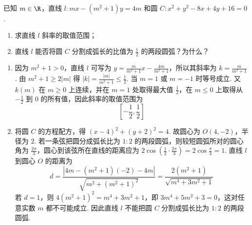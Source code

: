 \begin{problem}
已知 \(m \in \R\)，直线 \(l: mx - (m^2 + 1)y = 4m\) 和圆 \(C: x^2 + y^2 - 8x + 4y + 16 = 0\).

\begin{enumerate}
\item 求直线 \(l\) 斜率的取值范围；
\item 直线 \(l\) 能否将圆 \(C\) 分割成弧长的比值为 \(\frac{1}{2}\) 的两段圆弧？为什么？
\end{enumerate}

\begin{solution}
\begin{enumerate}
\item 因为 \(m^{2}+1>0\)，直线 \(l\) 可写为 \(y=\frac{m}{m^{2}+1}x-\frac{4m}{m^{2}+1}\)，所以其斜率为 \(k=\frac{m}{m^{2}+1}\). 由 \(m^{2}+1\geqslant2|m|\) 得 \(|k|=\frac{|m|}{m^{2}+1}\leqslant\frac{1}{2}\).
当 \(m=1\) 或 \(m=-1\) 时等号成立. 又 \(k(m)\) 在 \(m\geqslant0\) 上连续，并在 \(m=1\) 处取得最大值 \(\frac12\)，在 \(m\leqslant0\) 上取得从 \(-\frac12\) 到 \(0\) 的所有值，因此斜率的取值范围为
\[
\left[-\frac12,\frac12\right]
\]

\item 将圆 \(C\) 的方程配方，得 \((x-4)^2+(y+2)^2=4\). 故圆心为 \(O(4,-2)\)，半径为 \(2\). 若一条弦把圆分成弧长比为 \(1:2\) 的两段圆弧，则较短圆弧所对的圆心角为 \(\frac{2\pi}{3}\)，圆心到该弦所在直线的距离应为 \(2\cos\left(\frac12\cdot\frac{2\pi}{3}\right)=2\cos\frac{\pi}{3}=1\).
直线 \(l\) 到圆心 \(O\) 的距离为
\[
d=\frac{|4m-(m^{2}+1)(-2)-4m|}{\sqrt{m^{2}+(m^{2}+1)^{2}}}
=\frac{2(m^{2}+1)}{\sqrt{m^{4}+3m^{2}+1}}
\]
若 \(d=1\)，则 \(4(m^{2}+1)^{2}=m^{4}+3m^{2}+1\)，即 \(3m^{4}+5m^{2}+3=0\)，这对任意实数 \(m\) 都不可能成立. 因此直线 \(l\) 不能把圆 \(C\) 分割成弧长比为 \(1:2\) 的两段圆弧.
\end{enumerate}
\end{solution}
\end{problem}


